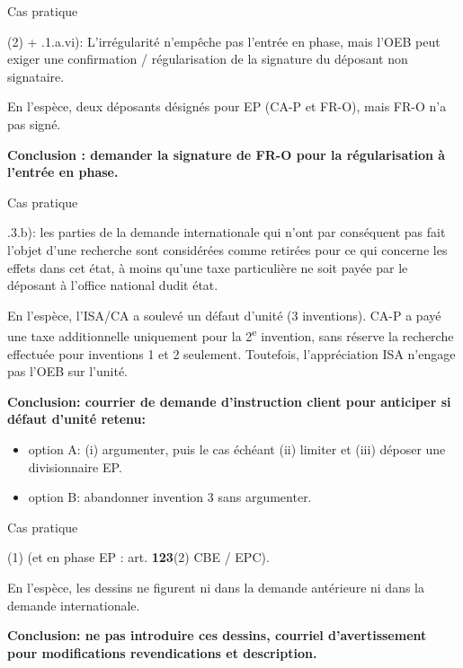 \begin{frame}{Cas pratique}

\begin{block}{}
(2) + .1.a.vi): L’irrégularité n’empêche pas l’entrée en phase, mais l’OEB peut exiger une
confirmation / régularisation de la signature du déposant non signataire.
\end{block}

En l'espèce, deux déposants désignés pour EP (CA-P et FR-O),
mais FR-O n'a pas signé.\newline

\textbf{Conclusion : demander la signature de FR-O pour la régularisation
à l’entrée en phase.}

\end{frame}

\begin{frame}{Cas pratique}

\begin{block}{}
.3.b):  les parties de la demande internationale qui n'ont par conséquent pas fait l'objet d'une recherche 
sont considérées comme retirées pour ce qui concerne les effets dans cet état, 
à moins qu'une taxe particulière ne soit payée par le déposant à l'office national dudit état.
\end{block}

En l'espèce, l’ISA/CA a soulevé un défaut d’unité (3 inventions). CA-P a payé une taxe additionnelle
uniquement pour la 2\textsuperscript{e} invention, sans réserve la recherche effectuée
pour inventions 1 et 2 seulement. Toutefois, l’appréciation ISA n’engage pas l’OEB sur l’unité.\newline

\textbf{Conclusion: courrier de demande d'instruction client
pour anticiper si défaut d'unité retenu:}
\begin{itemize}
  \item option A: (i) argumenter, puis le cas échéant (ii) limiter et (iii) déposer une divisionnaire EP.
  \item option B: abandonner invention 3 sans argumenter.
\end{itemize}

\end{frame}

\begin{frame}{Cas pratique}

\begin{block}{}
(1) (et en phase EP : art. \textbf{123}(2) CBE / EPC).
\end{block}

En l'espèce, les dessins ne figurent ni dans la demande
antérieure ni dans la demande internationale.\newline

\textbf{Conclusion: ne pas introduire ces dessins,
courriel d'avertissement pour modifications revendications
et description.}

\end{frame}

